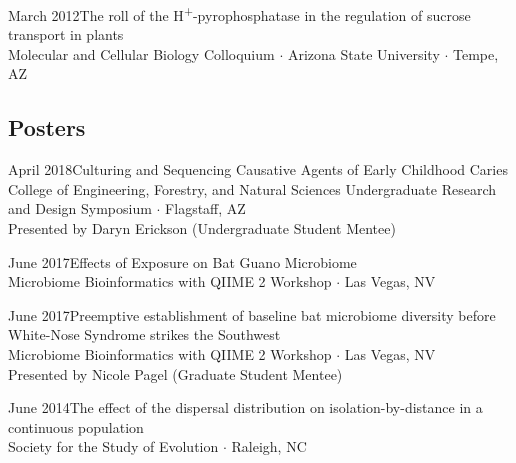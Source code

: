 \documentclass[]{cv-style}          %
\begin{document}
\begin{entrylist}
\entry
{March 2012}{\normalfont The roll of the H\textsuperscript{+}-pyrophosphatase in the regulation of sucrose transport in plants}{\\Molecular and Cellular Biology Colloquium $\cdot$ Arizona State University $\cdot$ Tempe, AZ}
{\vspace{-0.3cm}}
\end{entrylist}

\subsection{Posters}
\begin{entrylist}
\entry
{April 2018}{\normalfont Culturing and Sequencing Causative Agents of Early Childhood Caries}{\\College of Engineering, Forestry, and Natural Sciences Undergraduate Research and Design Symposium $\cdot$ Flagstaff, AZ\\
Presented by Daryn Erickson (Undergraduate Student Mentee)}
{\vspace{-0.3cm}}
\end{entrylist}

\begin{entrylist}
\entry
{June 2017}{\normalfont Effects of Exposure on Bat Guano Microbiome}{\\Microbiome Bioinformatics with QIIME 2 Workshop $\cdot$ Las Vegas, NV}
{\vspace{-0.3cm}}
\end{entrylist}

\begin{entrylist}
\entry
{June 2017}{\normalfont Preemptive establishment of baseline bat microbiome diversity before White-Nose Syndrome strikes the Southwest}{\\Microbiome Bioinformatics with QIIME 2 Workshop $\cdot$ Las Vegas, NV\\Presented by Nicole Pagel (Graduate Student Mentee)}
{\vspace{-0.3cm}}
\end{entrylist}

\begin{entrylist}
\entry
{June 2014}{\normalfont The effect of the dispersal distribution on isolation-by-distance in a continuous population}{\\Society for the Study of Evolution $\cdotp$ Raleigh, NC}
{\vspace{-0.3cm}}
\end{entrylist}
\end{document}

